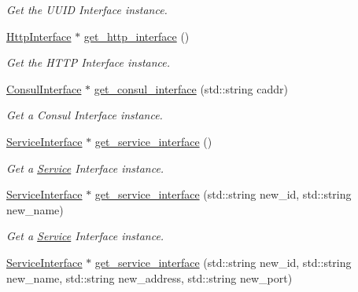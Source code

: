 \begin{DoxyCompactItemize}
\begin{DoxyCompactList}\small\item\em Get the U\-U\-I\-D Interface instance. \end{DoxyCompactList}\item 
\hypertarget{classServiceComponentFactory_a231204b51354b045ea3d5fff7b07ec94}{\hyperlink{classHttpInterface}{Http\-Interface} $\ast$ \hyperlink{classServiceComponentFactory_a231204b51354b045ea3d5fff7b07ec94}{get\-\_\-http\-\_\-interface} ()}\label{classServiceComponentFactory_a231204b51354b045ea3d5fff7b07ec94}

\begin{DoxyCompactList}\small\item\em Get the H\-T\-T\-P Interface instance. \end{DoxyCompactList}\item 
\hypertarget{classServiceComponentFactory_a8f1a67c4158e2e9fc844563b7c35dc15}{\hyperlink{classConsulInterface}{Consul\-Interface} $\ast$ \hyperlink{classServiceComponentFactory_a8f1a67c4158e2e9fc844563b7c35dc15}{get\-\_\-consul\-\_\-interface} (std\-::string caddr)}\label{classServiceComponentFactory_a8f1a67c4158e2e9fc844563b7c35dc15}

\begin{DoxyCompactList}\small\item\em Get a Consul Interface instance. \end{DoxyCompactList}\item 
\hypertarget{classServiceComponentFactory_a18fc7b189a89281312ae594db57bf9f3}{\hyperlink{classServiceInterface}{Service\-Interface} $\ast$ \hyperlink{classServiceComponentFactory_a18fc7b189a89281312ae594db57bf9f3}{get\-\_\-service\-\_\-interface} ()}\label{classServiceComponentFactory_a18fc7b189a89281312ae594db57bf9f3}

\begin{DoxyCompactList}\small\item\em Get a \hyperlink{classService}{Service} Interface instance. \end{DoxyCompactList}\item 
\hypertarget{classServiceComponentFactory_ae0f4ffe321b3ef4f0677a319a29bb7ac}{\hyperlink{classServiceInterface}{Service\-Interface} $\ast$ \hyperlink{classServiceComponentFactory_ae0f4ffe321b3ef4f0677a319a29bb7ac}{get\-\_\-service\-\_\-interface} (std\-::string new\-\_\-id, std\-::string new\-\_\-name)}\label{classServiceComponentFactory_ae0f4ffe321b3ef4f0677a319a29bb7ac}

\begin{DoxyCompactList}\small\item\em Get a \hyperlink{classService}{Service} Interface instance. \end{DoxyCompactList}\item 
\hypertarget{classServiceComponentFactory_a00f71ee92a14c3d850d8dd7e808d4b19}{\hyperlink{classServiceInterface}{Service\-Interface} $\ast$ \hyperlink{classServiceComponentFactory_a00f71ee92a14c3d850d8dd7e808d4b19}{get\-\_\-service\-\_\-interface} (std\-::string new\-\_\-id, std\-::string new\-\_\-name, std\-::string new\-\_\-address, std\-::string new\-\_\-port)}\label{classServiceComponentFactory_a00f71ee92a14c3d850d8dd7e808d4b19}


\end{DoxyCompactItemize}
